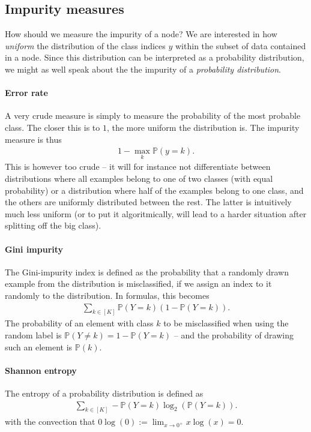 \documentclass{article}
\begin{document}
\subsection{Impurity measures} How should we measure the impurity of a node? We are interested in how \emph{uniform} the distribution of the class indices $y$ within the subset of data contained in a node. Since this distribution can be interpreted as a probability distribution, we might as well speak about the the impurity of a \emph{probability distribution}.

\paragraph{Error rate} A very crude measure is simply to measure the probability of the most probable class. The closer this is to $1$, the more uniform the distribution is. The impurity measure is thus
\begin{align*}
    1 - \max_k \mathbb{P}(y=k).
\end{align*}
This is however too crude -- it will for instance not differentiate between distributions where all examples belong to one of two classes (with equal probability) or a distribution where half of the examples belong to one class, and the others are uniformly distributed between the rest. The latter is intuitively much less uniform (or to put it algoritmically, will lead to a harder situation after splitting off the big class).

\paragraph{Gini impurity} The Gini-impurity index is defined as the probability that a randomly drawn example from the distribution is misclassified, if we assign an index to it randomly to the distribution. In formulas, this becomes
\begin{align*}
    \sum_{k \in [K]} \mathbb{P}(Y=k)(1-\mathbb{P}(Y=k)).
\end{align*}
The probability of an element with class $k$ to be misclassified when using the random label is $\mathbb{P}(Y\neq k)=1-\mathbb{P}(Y=k)$ -- and the probability of drawing such an element is $\mathbb{P}(k)$.

\paragraph{Shannon entropy} The entropy of a probability distribution is defined as 
\begin{align*}
    \sum_{k \in [K]} -\mathbb{P}(Y=k)\log_2(\mathbb{P}(Y=k)).
\end{align*}
with the convection that $0\log(0) :=\lim_{x\to 0^+}x\log(x)=0$.
\end{document}
